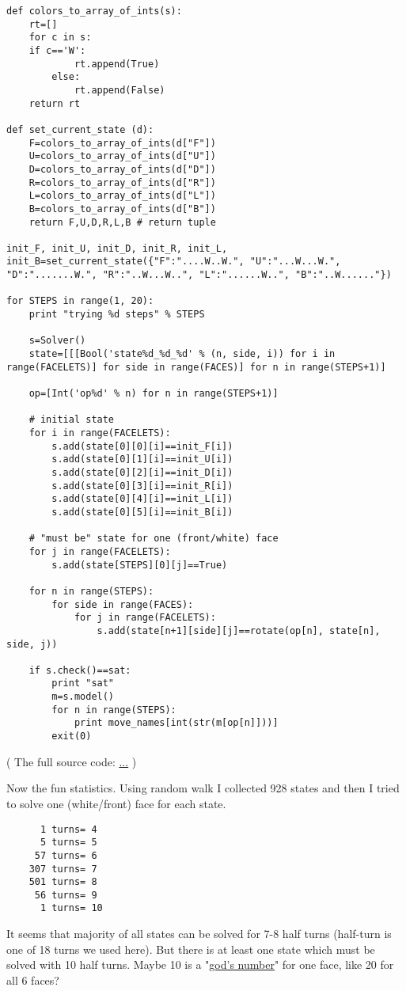 \begin{lstlisting}
def colors_to_array_of_ints(s):
    rt=[]
    for c in s:
	if c=='W':
            rt.append(True)
        else:
            rt.append(False)
    return rt

def set_current_state (d):
    F=colors_to_array_of_ints(d["F"])
    U=colors_to_array_of_ints(d["U"])
    D=colors_to_array_of_ints(d["D"])
    R=colors_to_array_of_ints(d["R"])
    L=colors_to_array_of_ints(d["L"])
    B=colors_to_array_of_ints(d["B"])
    return F,U,D,R,L,B # return tuple

init_F, init_U, init_D, init_R, init_L, init_B=set_current_state({"F":"....W..W.", "U":"...W...W.", "D":".......W.", "R":"..W...W..", "L":"......W..", "B":"..W......"})

for STEPS in range(1, 20):
	print "trying %d steps" % STEPS

	s=Solver()
	state=[[[Bool('state%d_%d_%d' % (n, side, i)) for i in range(FACELETS)] for side in range(FACES)] for n in range(STEPS+1)]

	op=[Int('op%d' % n) for n in range(STEPS+1)]

	# initial state
	for i in range(FACELETS):
		s.add(state[0][0][i]==init_F[i])
		s.add(state[0][1][i]==init_U[i])
		s.add(state[0][2][i]==init_D[i])
		s.add(state[0][3][i]==init_R[i])
		s.add(state[0][4][i]==init_L[i])
		s.add(state[0][5][i]==init_B[i])

	# "must be" state for one (front/white) face
	for j in range(FACELETS):
		s.add(state[STEPS][0][j]==True)

	for n in range(STEPS):
		for side in range(FACES):
			for j in range(FACELETS):
				s.add(state[n+1][side][j]==rotate(op[n], state[n], side, j))

	if s.check()==sat:
		print "sat"
		m=s.model()
		for n in range(STEPS):
			print move_names[int(str(m[op[n]]))]
		exit(0)
\end{lstlisting}

( The full source code: \url{...} )

Now the fun statistics.
Using random walk I collected 928 states and then I tried to solve one (white/front) face for each state.

\begin{lstlisting}
      1 turns= 4
      5 turns= 5
     57 turns= 6
    307 turns= 7
    501 turns= 8
     56 turns= 9
      1 turns= 10
\end{lstlisting}

It seems that majority of all states can be solved for 7-8 half turns (half-turn is one of 18 turns we used here).
But there is at least one state which must be solved with 10 half turns.
Maybe 10 is a "\href{http://www.cube20.org/}{god’s number}" for one face, like 20 for all 6 faces?

